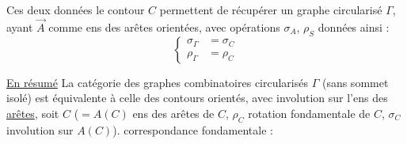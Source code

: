 Ces deux données  le contour $C$ permettent de récupérer un graphe circularisé $\Gamma$, ayant $\vec A$ comme ens des arêtes orientées, avec opérations $\sigma_A$, $\rho_S$ données ainsi :
\[
\left\{\begin{aligned}
\sigma_\Gamma&=\sigma_C\\
\rho_\Gamma&=\rho_C
\end{aligned}\right.
\]

\uline{En résumé} La catégorie des graphes combinatoires circularisés $\Gamma$ (sans sommet isolé)  est équivalente à celle des contours orientés, avec involution  sur l'ens des \uline{arêtes}, soit $C$ ($=A(C)$ ens des arêtes de $C$, $\rho_C$ rotation fondamentale de $C$, $\sigma_C$ involution sur $A(C)$).   correspondance fondamentale :

\begin{center}\end{center}
